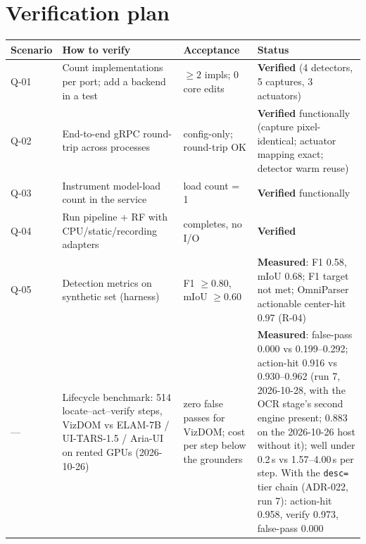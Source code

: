 \documentclass[11pt,a4paper]{report}
\newcommand{\code}[1]{\texttt{#1}}
\begin{document}
\section{Verification plan}
\begin{longtable}{@{}p{2.0cm}p{5.4cm}p{4.4cm}p{2.2cm}@{}}
\toprule
\textbf{Scenario} & \textbf{How to verify} & \textbf{Acceptance} & \textbf{Status} \\
\midrule
\endhead
Q-01 & Count implementations per port; add a backend in a test & $\geq 2$ impls; 0 core edits & \textbf{Verified} (4 detectors, 5 captures, 3 actuators) \\
Q-02 & End-to-end gRPC round-trip across processes & config-only; round-trip OK & \textbf{Verified} functionally (capture pixel-identical; actuator mapping exact; detector warm reuse) \\
Q-03 & Instrument model-load count in the service & load count = 1 & \textbf{Verified} functionally \\
Q-04 & Run pipeline + RF with CPU/static/recording adapters & completes, no I/O & \textbf{Verified} \\
Q-05 & Detection metrics on synthetic set (harness) & F1 $\geq 0.80$, mIoU $\geq 0.60$ & \textbf{Measured}: F1 0.58, mIoU 0.68; F1 target not met; OmniParser actionable center-hit 0.97 (R-04) \\
--- & Lifecycle benchmark: 514 locate--act--verify steps, VizDOM vs ELAM-7B / UI-TARS-1.5 / Aria-UI on rented GPUs (2026-10-26) & zero false passes for VizDOM; cost per step below the grounders & \textbf{Measured}: false-pass 0.000 vs 0.199--0.292; action-hit 0.916 vs 0.930--0.962 (run 7, 2026-10-28, with the OCR stage's second engine present; 0.883 on the 2026-10-26 host without it); well under 0.2\,s vs 1.57--4.00\,s per step. With the \code{desc=} tier chain (ADR-022, run 7): action-hit 0.958, verify 0.973, false-pass 0.000 \\
\bottomrule
\end{longtable}

\end{document}
